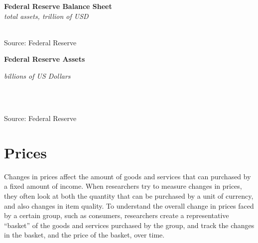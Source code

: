 \documentclass{report}
\makeatletter
\newcommand{\tbllink}[1]{\href{https://raw.githubusercontent.com/bdecon/US-chartbook/master/chartbook/data/#1}{\faTable}}
\newcommand*\short[1]{\expandafter\@gobbletwo\number\numexpr#1\relax}
\newcommand{\dateaxisticks}{
		date coordinates in=x, axis line style={draw=none},
		xmax={2020-05-10},
		max space between ticks=40,	    
		xtick={{1990-01-01}, {1992-01-01}, {1994-01-01}, 
			{1996-01-01}, {1998-01-01}, {2000-01-01}, 
			{2002-01-01}, {2004-01-01}, {2006-01-01},
			{2008-01-01}, {2010-01-01}, {2012-01-01}, {2014-01-01},
		    {2016-01-01}, {2018-01-01}, {2020-01-01}},
		minor xtick={{1989-01-01}, {1991-01-01}, {1993-01-01},
			{1995-01-01}, {1997-01-01}, {1999-01-01}, 
			{2001-01-01}, {2003-01-01}, {2005-01-01}, {2007-01-01},
		    {2009-01-01}, {2011-01-01}, {2013-01-01}, {2015-01-01},
		    {2017-01-01}, {2019-01-01}},
		enlarge y limits={0.06}, enlarge x limits={0.01},
		}
\newcommand{\bbar}[2]{extra #1 ticks = {{#2}}, extra #1 tick labels = ,
		extra #1 tick style = {grid=major, grid style={thick, black!25}},}
\newcommand{\stdline}[4]{\addplot[very thick, no markers, color=#1] 
		table [x=#2, y=#3, col sep=comma] {#4};	}
\makeatother
\begin{document}
{{{{{{{{{\begin{minipage}{0.39\textwidth}
\noindent \normalsize \textbf{Federal Reserve Balance Sheet}\\
\footnotesize{\textit{total assets, trillion of USD}}\\ 
\noindent \hspace*{-2mm} \\
\footnotesize{Source: Federal Reserve} \hspace{22mm} \tbllink{fed_assets.csv}
\end{minipage}\hspace{1mm}
\begin{minipage}{0.36\textwidth}
\small 
\end{minipage}

\vspace{10mm}


\noindent \normalsize \textbf{Federal Reserve Assets}\\
\footnotesize{\textit{billions of US Dollars}\\ \vspace{4mm}
\noindent \hspace*{-3mm}  \setlength{\tabcolsep}{3.1pt} \color{black!90}
		{\renewcommand{\arraystretch}{1.54}
\begin{tabular}{p{40mm} R{13.0mm} R{13.0mm} R{13.0mm}
		 		 R{13.0mm} R{13.0mm}}
			 
			 \hline
		\end{tabular}
		}	\\}
		
\vspace{-5.5mm}
\footnotesize{Source: Federal Reserve}



\newpage

\begin{minipage}{0.76\textwidth}
\section*{\color{darkgray}\LARGE Prices}
\label{sec:pr}
\small 
Changes in prices affect the amount of goods and services that can purchased by a fixed amount of income. When researchers try to measure changes in prices, they often look at both the quantity that can be purchased by a unit of currency, and also changes in item quality. To understand the overall change in prices faced by a certain group, such as consumers, researchers create a representative ``basket'' of the goods and services purchased by the group, and track the changes in the basket, and the price of the basket, over time. 



\end{minipage}}}}}}}}}}
\end{document}
